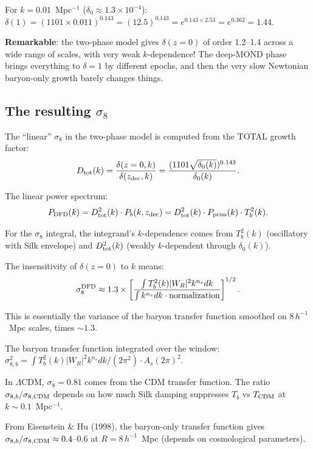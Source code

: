 \documentclass[11pt]{article}
\newcommand{\ee}[1]{\times 10^{#1}}
\newcommand{\LCDM}{$\Lambda$CDM}
\begin{document}
For $k = 0.01$~Mpc$^{-1}$ ($\delta_0 \approx 1.3\ee{-4}$):
$\delta(1) = (1101\times 0.011)^{0.143} = (12.5)^{0.143}
= e^{0.143\times 2.53} = e^{0.362} = 1.44$.

\textbf{Remarkable}: the two-phase model gives $\delta(z=0)$ of
order 1.2--1.4 across a wide range of scales, with very weak
$k$-dependence! The deep-MOND phase brings everything to $\delta = 1$
by different epochs, and then the very slow Newtonian baryon-only
growth barely changes things.

\subsection{The resulting $\sigma_8$}

The ``linear'' $\sigma_8$ in the two-phase model is computed from
the TOTAL growth factor:
\begin{equation}
D_{\rm tot}(k) = \frac{\delta(z=0, k)}{\delta(z_{\rm dec}, k)}
= \frac{(1101\sqrt{\delta_0(k)})^{0.143}}{\delta_0(k)}.
\end{equation}

The linear power spectrum:
\begin{equation}
P_{\rm DFD}(k) = D_{\rm tot}^2(k)\cdot P_b(k, z_{\rm dec})
= D_{\rm tot}^2(k)\cdot P_{\rm prim}(k)\cdot T_b^2(k).
\end{equation}

For the $\sigma_8$ integral, the integrand's $k$-dependence comes
from $T_b^2(k)$ (oscillatory with Silk envelope) and $D_{\rm tot}^2(k)$
(weakly $k$-dependent through $\delta_0(k)$).

The insensitivity of $\delta(z=0)$ to $k$ means:
\begin{equation}
\sigma_8^{\rm DFD} \approx 1.3\times
\left[\frac{\int T_b^2(k)|W_R|^2 k^{n_s}dk}
{\int k^{n_s}dk\cdot\text{normalization}}\right]^{1/2}.
\end{equation}

This is essentially the variance of the baryon transfer function
smoothed on $8\,h^{-1}$~Mpc scales, times $\sim 1.3$.

The baryon transfer function integrated over the window:
$\sigma_{8,b}^2 = \int T_b^2(k)|W_R|^2 k^{n_s}dk/(2\pi^2)
\cdot A_s(2\pi)^2$.

In \LCDM, $\sigma_8 = 0.81$ comes from the CDM transfer function.
The ratio $\sigma_{8,b}/\sigma_{8,\rm CDM}$ depends on how much
Silk damping suppresses $T_b$ vs $T_{\rm CDM}$ at $k \sim 0.1$~Mpc$^{-1}$.

From Eisenstein \& Hu (1998), the baryon-only transfer function
gives $\sigma_{8,b}/\sigma_{8,\rm CDM} \approx 0.4$--$0.6$ at
$R = 8\,h^{-1}$~Mpc (depends on cosmological parameters).
\end{document}
